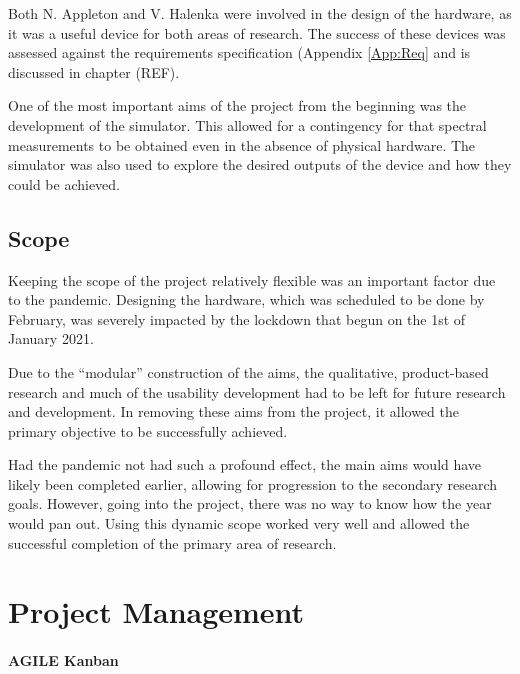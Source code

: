 Both N. Appleton and V. Halenka were involved in the design of the hardware, as it was a useful device for both areas of research. The success of these devices was assessed against the requirements specification (Appendix \ref{App:Req} and is discussed in chapter (REF).

One of the most important aims of the project from the beginning was the development of the simulator. This allowed for a contingency for that spectral measurements to be obtained even in the absence of physical hardware. The simulator was also used to explore the desired outputs of the device and how they could be achieved.

\subsection{Scope}

Keeping the scope of the project relatively flexible was an important factor due to the pandemic. Designing the hardware, which was scheduled to be done by February, was severely impacted by the lockdown that begun on the 1st of January 2021. 

Due to the ``modular'' construction of the aims, the qualitative, product-based research and much of the usability development had to be left for future research and development. In removing these aims from the project, it allowed the primary objective to be successfully achieved.

Had the pandemic not had such a profound effect, the main aims would have likely been completed earlier, allowing for progression to the secondary research goals. However, going into the project, there was no way to know how the year would pan out. Using this dynamic scope worked very well and allowed the successful completion of the primary area of research. 



\section{Project Management}


\paragraph{AGILE Kanban}

